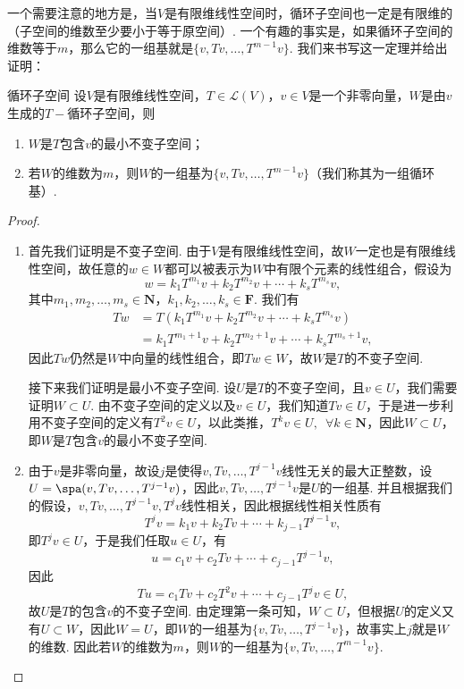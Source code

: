 一个需要注意的地方是，当$V$是有限维线性空间时，循环子空间也一定是有限维的（子空间的维数至少要小于等于原空间）. 一个有趣的事实是，如果循环子空间的维数等于$m$，那么它的一组基就是$\{v,Tv,\ldots,T^{m-1}v\}$. 我们来书写这一定理并给出证明：
\begin{theorem}{}{循环子空间}
    设$V$是有限维线性空间，$T\in\mathcal{L}(V)$，$v\in V$是一个非零向量，$W$是由$v$生成的$T-\text{循环子空间}$，则
    \begin{enumerate}
        \item $W$是$T$包含$v$的最小不变子空间；
        \item 若$W$的维数为$m$，则$W$的一组基为$\{v,Tv,\ldots,T^{m-1}v\}$（我们称其为一组循环基）.
    \end{enumerate}
\end{theorem}
\begin{proof}
    \begin{enumerate}
        \item 首先我们证明是不变子空间. 由于$V$是有限维线性空间，故$W$一定也是有限维线性空间，故任意的$w\in W$都可以被表示为$W$中有限个元素的线性组合，假设为
              \[w=k_1T^{m_1}v+k_2T^{m_2}v+\cdots+k_sT^{m_s}v,\]
              其中$m_1,m_2,\ldots,m_s\in\mathbf{N}$，$k_1,k_2,\ldots,k_s\in\mathbf{F}$. 我们有
              \[\begin{aligned}
                      Tw & =T(k_1T^{m_1}v+k_2T^{m_2}v+\cdots+k_sT^{m_s}v)     \\
                         & =k_1T^{m_1+1}v+k_2T^{m_2+1}v+\cdots+k_sT^{m_s+1}v,
                  \end{aligned}\]
              因此$Tw$仍然是$W$中向量的线性组合，即$Tw\in W$，故$W$是$T$的不变子空间.

              接下来我们证明是最小不变子空间. 设$U$是$T$的不变子空间，且$v\in U$，我们需要证明$W\subset U$. 由不变子空间的定义以及$v\in U$，我们知道$Tv\in U$，于是进一步利用不变子空间的定义有$T^2v\in U$，以此类推，$T^kv\in U,\enspace\forall k\in\mathbf{N}$，因此$W\subset U$，即$W$是$T$包含$v$的最小不变子空间.

        \item 由于$v$是非零向量，故设$j$是使得$v,Tv,\ldots,T^{j-1}v$线性无关的最大正整数，设$U=\spa(v,Tv,\ldots,T^{j-1}v)$，因此$v,Tv,\ldots,T^{j-1}v$是$U$的一组基. 并且根据我们的假设，$v,Tv,\ldots,T^{j-1}v,T^jv$线性相关，因此根据线性相关性质有
              \[T^jv=k_1v+k_2Tv+\cdots+k_{j-1}T^{j-1}v,\]
              即$T^jv\in U$，于是我们任取$u\in U$，有
              \[u=c_1v+c_2Tv+\cdots+c_{j-1}T^{j-1}v,\]
              因此
              \[Tu=c_1Tv+c_2T^2v+\cdots+c_{j-1}T^jv\in U,\]
              故$U$是$T$的包含$v$的不变子空间. 由定理第一条可知，$W\subset U$，但根据$U$的定义又有$U\subset W$，因此$W=U$，即$W$的一组基为$\{v,Tv,\ldots,T^{j-1}v\}$，故事实上$j$就是$W$的维数. 因此若$W$的维数为$m$，则$W$的一组基为$\{v,Tv,\ldots,T^{m-1}v\}$.
    \end{enumerate}
\end{proof}

